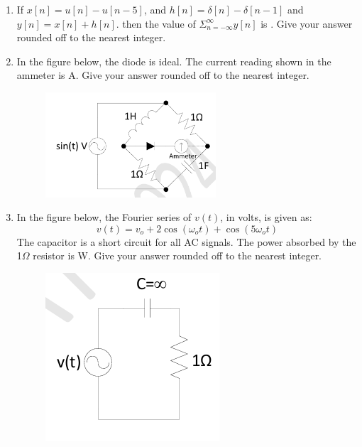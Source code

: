 \documentclass[a4paper,12pt]{exam}
\numberwithin{equation}{enumi}
\numberwithin{figure}{enumi}
\begin{document}
\begin{enumerate}
\hfill{}

\item If $x[n] = u[n] - u[n - 5]$, and $h[n] = \delta[n] - \delta[n - 1]$ and $y[n] = x[n] + h[n]$. then the value of $\Sigma_{n=-\infty}^{\infty}y[n]$ is \underline{\hspace{1cm}}. Give your answer rounded off to the nearest integer.

\hfill{}

\item In the figure below, the diode is ideal. The current reading shown in the ammeter is   \underline{\hspace{1cm}} A. Give your answer rounded off to the nearest integer. 

\hfill{}


\begin{figure}[H]
\centering
\includegraphics[width=0.6\textwidth]{figs/Q60.png}
\label{fig:Q60.png}
\end{figure}

\item In the figure below, the Fourier series of $v(t)$, in volts, is given as: \\[4pt]
\begin{equation*}
v(t) = v_o + 2\cos (\omega_ot) + \cos (5\omega_ot)
\end{equation*}
The capacitor is a short circuit for all AC signals. The power absorbed by the 1$\Omega$ resistor is \underline{\hspace{1cm}} W. Give your answer rounded off to the nearest integer. 

\begin{figure}[H]
\centering
\includegraphics[width=0.5\columnwidth]{figs/Q61.png}
\label{fig:Q61.png}
\end{figure}


\end{enumerate}
\end{document}
